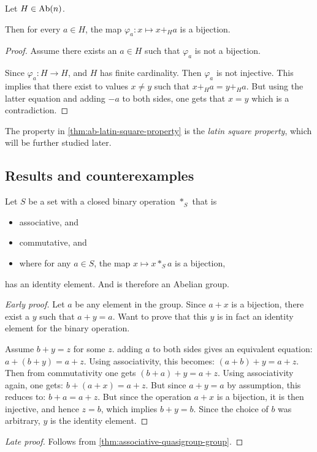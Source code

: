 \begin{theorem} \label{thm:ab-latin-square-property}
    Let \( H \in \operatorname{Ab}(n) \).

    Then for every \( a \in H \), the map \( \varphi_a: x \mapsto x +_H a \) is a bijection.
\end{theorem}
\begin{proof}
    Assume there exists an \( a \in H \) such that \( \varphi_a \) is not a bijection.
    
    Since \( \varphi_a: H \to H \), and \( H \) has finite cardinality. Then \( \varphi_a \) is not injective. This implies that there exist to values \( x \neq y \) such that \( x +_H a = y +_H a \). But using the latter equation and adding \( -a \) to both sides, one gets that \( x = y \) which is a contradiction.
\end{proof}

\begin{remark}
    The property in \autoref{thm:ab-latin-square-property} is the \emph{latin square property}, which will be further studied later.
\end{remark}

\subsection{Results and counterexamples}

\begin{theorem}
    Let \( S \) be a set with a closed binary operation \( *_S \) that is
    \begin{itemize}
        \item associative, and
        \item commutative, and
        \item where for any \( a \in S \), the map \( x \mapsto x *_S a \) is a bijection,
    \end{itemize}
    has an identity element. And is therefore an Abelian group.
\end{theorem}
\begin{proof}[Early proof]
    Let \( a \) be any element in the group. Since \( a + x \) is a bijection, there exist a \( y \) such that \( a + y = a \). Want to prove that this \( y \) is in fact an identity element for the binary operation.

    Assume \( b + y = z\) for some \( z \). adding \( a \) to both sides gives an equivalent equation: \( a + (b + y) = a + z \). Using associativity, this becomes: \( (a + b) + y = a + z \). Then from commutativity one gets \( (b + a) + y = a + z \). Using associativity again, one gets: \( b + (a + x) = a + z\). But since \( a + y = a \) by assumption, this reduces to: \( b + a = a + z \). But since the operation \( a + x\) is a bijection, it is then injective, and hence \( z = b \), which implies \( b + y = b\). Since the choice of \( b \) was arbitrary, \( y \) is the identity element.
\end{proof}
\begin{proof}[Late proof]
    Follows from \autoref{thm:associative-quasigroup-group}.
\end{proof}

